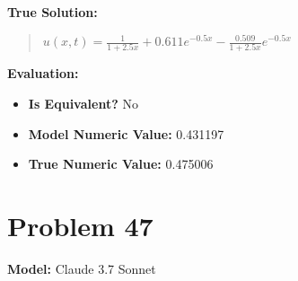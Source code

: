 \documentclass{article}
\begin{document}
\textbf{True Solution:}
\begin{quote}
$u(x,t) = \frac{1}{1 + 2.5x} + 0.611 e^{-0.5 x} - \frac{0.509}{1 + 2.5x} e^{-0.5 x}$
\end{quote}

\textbf{Evaluation:}
\begin{itemize}
\item \textbf{Is Equivalent?} No
\item \textbf{Model Numeric Value:} 0.431197
\item \textbf{True Numeric Value:} 0.475006
\end{itemize}
\vspace{1cm}
\section*{Problem 47}
\textbf{Model:} Claude 3.7 Sonnet
\end{document}
